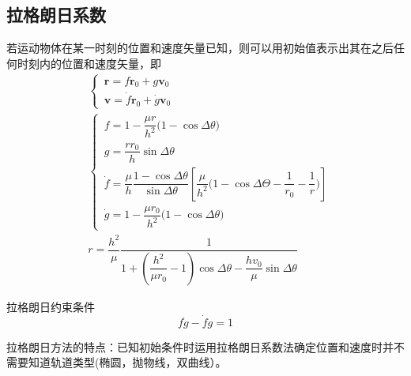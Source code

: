 \documentclass[10pt,a4]{article}
\numberwithin{equation}{section}
\newcommand{\para}{\par \hspace*{2em}}
\begin{document}
\subsection{拉格朗日系数}
\para 若运动物体在某一时刻的位置和速度矢量已知，则可以用初始值表示出其在之后任何时刻内的位置和速度矢量，即
\begin{align}
&\begin{cases}
	\, \bm{r} = f \bm{r}_0 + g\bm{v}_0\\
	\, \bm{v} = \dot{f}\bm{r}_0 + \dot{g}\bm{v}_0
\end{cases}\\[1em]
&
\begin{cases}
	\, f = 1 - \dfrac{\mu r}{h^2}\big(1 - \cos \Delta \theta\big)\\[0.8em]
	\, g = \dfrac{r r_0}{h}\sin \Delta \theta \\[0.8em]
	\, \dot{f} = \dfrac{\mu}{h}\dfrac{1 - \cos \Delta \theta}{\sin \Delta \theta} \left[ \dfrac{\mu}{h^2}\big(1 - \cos \Delta \Theta - \dfrac{1}{r_0} - \dfrac{1}{r} \big) \right]\\[0.8em]
	\, \dot{g} = 1 - \dfrac{\mu r_0}{h^2}\big( 1 - \cos \Delta \theta \big)
\end{cases}\\[1em]
& r = \dfrac{h^2}{\mu} \dfrac{1}{1 + \left( \dfrac{h^2}{\mu r_0} - 1 \right)\cos \Delta \theta - \dfrac{h v_0}{\mu} \sin \Delta \theta}
\end{align}
\para 拉格朗日约束条件
\begin{equation}
	f\dot{g} - \dot{f}g = 1
\end{equation}
\para 拉格朗日方法的特点：已知初始条件时运用拉格朗日系数法确定位置和速度时并不需要知道轨道类型(椭圆，抛物线，双曲线）。
\end{document}
